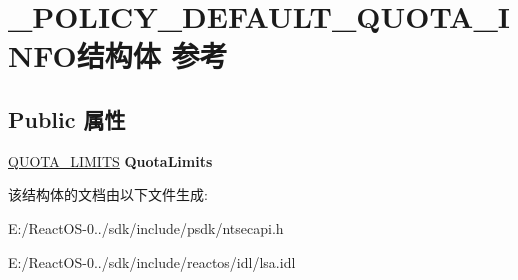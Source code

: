 \hypertarget{struct___p_o_l_i_c_y___d_e_f_a_u_l_t___q_u_o_t_a___i_n_f_o}{}\section{\+\_\+\+P\+O\+L\+I\+C\+Y\+\_\+\+D\+E\+F\+A\+U\+L\+T\+\_\+\+Q\+U\+O\+T\+A\+\_\+\+I\+N\+F\+O结构体 参考}
\label{struct___p_o_l_i_c_y___d_e_f_a_u_l_t___q_u_o_t_a___i_n_f_o}
\subsection*{Public 属性}
\begin{DoxyCompactItemize}
\item 
\mbox{\label{struct___p_o_l_i_c_y___d_e_f_a_u_l_t___q_u_o_t_a___i_n_f_o_aeb21a14cc7c5f2c14665a1755f1bb47d}} 
\hyperlink{struct___q_u_o_t_a___l_i_m_i_t_s}{Q\+U\+O\+T\+A\+\_\+\+L\+I\+M\+I\+TS} {\bfseries Quota\+Limits}
\end{DoxyCompactItemize}


该结构体的文档由以下文件生成\+:\begin{DoxyCompactItemize}
\item 
E\+:/\+React\+O\+S-\/0../sdk/include/psdk/ntsecapi.\+h\item 
E\+:/\+React\+O\+S-\/0../sdk/include/reactos/idl/lsa.\+idl\end{DoxyCompactItemize}
